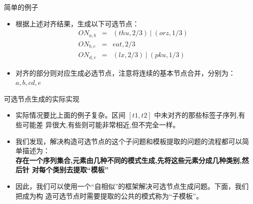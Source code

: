 \begin{frame}[label=sec-2-20]{简单的例子}
\begin{itemize}
\item 根据上述对齐结果，生成以下可选节点：
\begin{eqnarray*}
ON_{a,b}&=&(thu,2/3)~|~(orz,1/3)\\
ON_{b,c}&=&eat,2/3\\
ON_{d,e}&=&(lx,2/3)~|~(pku,1/3)
\end{eqnarray*}
\item 对齐的部分则对应生成必选节点，注意将连续的基本节点合并，分别为： $a,b,cd,e$
\end{itemize}
\end{frame}

\begin{frame}[label=sec-2-21]{可选节点生成的实际实现}
\begin{itemize}
\item 实际情况要比上面的例子复杂。区间 $[t1,t2]$ 中未对齐的那些标签子序列,有些可能差
异很大,有些则可能非常相近,但不完全一样。
\item 我们发现，解决构造可选节点的这个子问题和模板提取的问题的流程都可以简单描述为：
\\
\textbf{\scriptsize
存在一个序列集合,元素由几种不同的模式生成,先将这些元素分成几种类别,然后针
对每个类别去提取“模板”}
\item 因此，我们可以使用一个“自相似”的框架解决可选节点生成问题。下面，我们把成为构
造可选节点时需要提取的公共的模式称为“子模板”。
\end{itemize}
\end{frame}

